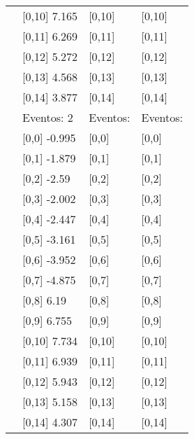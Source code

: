 \begin{table}
\begin{tabular}[t]{llll}
 & {}[0,10] 7.165 & {}[0,10] & {}[0,10]\\
 & {}[0,11] 6.269 & {}[0,11] & {}[0,11]\\
 & {}[0,12] 5.272 & {}[0,12] & {}[0,12]\\
\addlinespace
 & {}[0,13] 4.568 & {}[0,13] & {}[0,13]\\
 & {}[0,14] 3.877 & {}[0,14] & {}[0,14]\\
 & Eventos:  2 & Eventos: & Eventos:\\
 & {}[0,0] -0.995 & {}[0,0] & {}[0,0]\\
 & {}[0,1] -1.879 & {}[0,1] & {}[0,1]\\
\addlinespace
 & {}[0,2] -2.59 & {}[0,2] & {}[0,2]\\
 & {}[0,3] -2.002 & {}[0,3] & {}[0,3]\\
 & {}[0,4] -2.447 & {}[0,4] & {}[0,4]\\
 & {}[0,5] -3.161 & {}[0,5] & {}[0,5]\\
 & {}[0,6] -3.952 & {}[0,6] & {}[0,6]\\
\addlinespace
1000 & {}[0,7] -4.875 & {}[0,7] & {}[0,7]\\
 & {}[0,8] 6.19 & {}[0,8] & {}[0,8]\\
 & {}[0,9] 6.755 & {}[0,9] & {}[0,9]\\
 & {}[0,10] 7.734 & {}[0,10] & {}[0,10]\\
 & {}[0,11] 6.939 & {}[0,11] & {}[0,11]\\
\addlinespace
 & {}[0,12] 5.943 & {}[0,12] & {}[0,12]\\
 & {}[0,13] 5.158 & {}[0,13] & {}[0,13]\\
 & {}[0,14] 4.307 & {}[0,14] & {}[0,14]\\
\bottomrule
\end{tabular}
\end{table}
